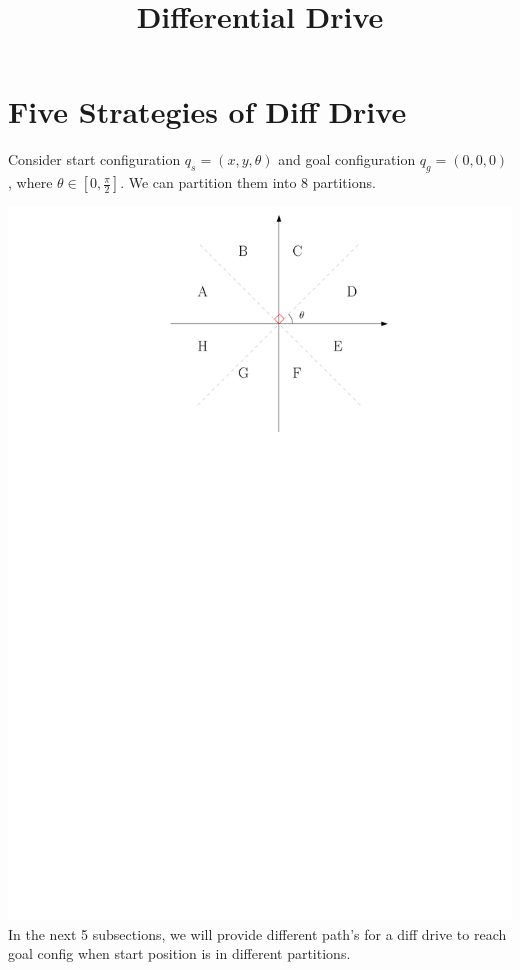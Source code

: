 \documentclass[12pt]{article}
\title{Differential Drive}
\date{}
\begin{document}
  \maketitle
  
  \section{Five Strategies of Diff Drive}
  
  Consider start configuration $q_{s} = (x,y,\theta)$ and goal configuration $q_{g} = (0,0,0)$, where $\theta \in [0, \frac{\pi}{2}]$. We can partition them into 8 partitions.
  
  \includegraphics{Coordinate}\\
  
  In the next 5 subsections, we will provide different path's for a diff drive to reach goal config when start position is in different partitions. 
  
\end{document}

